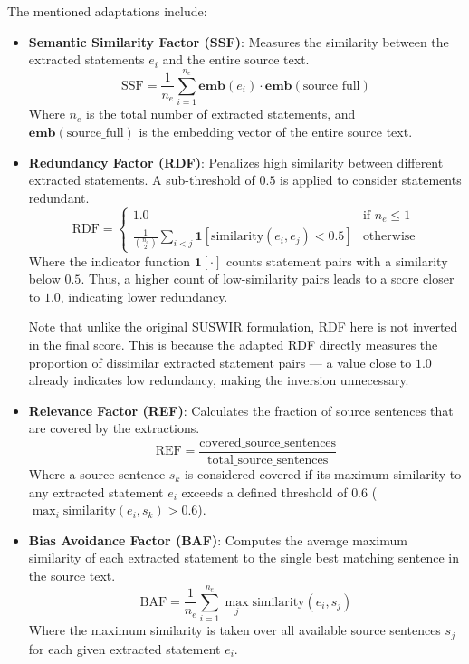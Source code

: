 The mentioned adaptations include:

\begin{itemize}
    \item \textbf{Semantic Similarity Factor (SSF)}: Measures the similarity between the extracted statements $e_i$ and the entire source text.
    \[
    \text{SSF} = \frac{1}{n_e} \sum_{i=1}^{n_e} \mathbf{emb}(e_i) \cdot \mathbf{emb}(\text{source\_full})
    \]
    Where $n_e$ is the total number of extracted statements, and $\mathbf{emb}(\text{source\_full})$ is the embedding vector of the entire source text.
    
    \item \textbf{Redundancy Factor (RDF)}: Penalizes high similarity between different extracted statements. A sub-threshold of $0.5$ is applied to consider statements redundant.
    \[
    \text{RDF} = \begin{cases}
    1.0 & \text{if } n_e \leq 1 \\
    \frac{1}{\binom{n_e}{2}} \sum_{i < j} \mathbf{1}[\text{similarity}(e_i, e_j) < 0.5] & \text{otherwise}
    \end{cases}
    \]
    Where the indicator function $\mathbf{1}[\cdot]$ counts statement pairs with a similarity below $0.5$. Thus, a higher count of low-similarity pairs leads to a score closer to $1.0$, indicating lower redundancy.

    Note that unlike the original SUSWIR formulation, RDF here is not inverted in the final score. This is because the adapted RDF directly measures the proportion of dissimilar extracted statement pairs — a value close to $1.0$ already indicates low redundancy, making the inversion unnecessary.
    
    \item \textbf{Relevance Factor (REF)}: Calculates the fraction of source sentences that are covered by the extractions.
    \[
    \text{REF} = \frac{\text{covered\_source\_sentences}}{\text{total\_source\_sentences}}
    \]
    Where a source sentence $s_k$ is considered covered if its maximum similarity to any extracted statement $e_i$ exceeds a defined threshold of $0.6$ ($\max_i \text{similarity}(e_i, s_k) > 0.6$).
    
    \item \textbf{Bias Avoidance Factor (BAF)}: Computes the average maximum similarity of each extracted statement to the single best matching sentence in the source text.
    \[
    \text{BAF} = \frac{1}{n_e} \sum_{i=1}^{n_e} \max_j \text{similarity}(e_i, s_j)
    \]
    Where the maximum similarity is taken over all available source sentences $s_j$ for each given extracted statement $e_i$.
\end{itemize}

